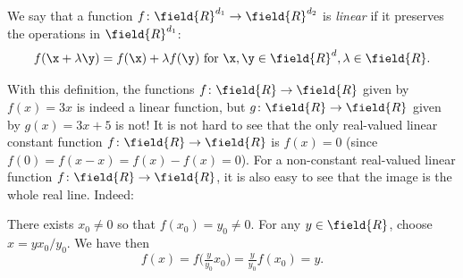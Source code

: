 


\begin{example}\label{example:linearFunction}
We say that a function $f \colon \field{R}^{d_1} \to \field{R}^{d_2}$ is \emph{linear} if it preserves the operations in $\field{R}^{d_1}$: 
\begin{equation*}
f(\x + \lambda \y) = f(\x) + \lambda f(\y) \text{ for }\x, \y \in \field{R}^d, \lambda \in \field{R}.
\end{equation*}

With this definition, the functions $f\colon \field{R} \to \field{R}$ given by $f(x) = 3x$ is indeed a linear function, but $g\colon \field{R} \to \field{R}$ given by $g(x)=3x+5$ is not!  
It is not hard to see that the only real-valued linear constant function $f\colon \field{R} \to \field{R}$ is $f(x) = 0$ (since $f(0)=f(x-x)=f(x)-f(x)=0$).  For a non-constant real-valued linear function $f\colon \field{R} \to \field{R}$, it is also easy to see that the image is the whole real line.  Indeed:

There exists $x_0\neq 0$ so that $f(x_0)=y_0\neq 0$. For any $y \in \field{R}$, choose $x = y x_0/y_0$.  We have then
\begin{equation*}
f(x) = f\big( \tfrac{y}{y_0} x_0 \big) = \tfrac{y}{y_0} f(x_0) = y.
\end{equation*}
\end{example}

